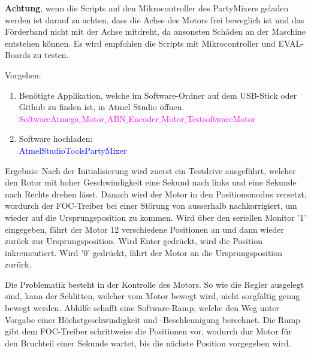 \newpage
\textbf{Achtung}, wenn die Scripts auf den Mikrocontroller des PartyMixers geladen werden ist darauf zu achten, dass die Achse des Motors frei beweglich ist und das Förderband nicht mit der Achse mitdreht, da ansonsten Schäden an der Maschine entstehen können. Es wird empfohlen die Scripts mit Mikrocontroller und EVAL-Boards zu testen.

Vorgehen:
\begin{enumerate}
\item Benötigte Applikation, welche im Software-Ordner auf dem USB-Stick oder Github \cite{aebi_projekt-6softwareatmega_2020} zu finden ist, in Atmel Studio öffnen.\\
\textcolor{magenta}{Software\textrightarrow Atmega\underline{ }Motor\underline{ }ABN\underline{ }Encoder\underline{ }Motor\underline{ }Testsoftware\textrightarrow Motor}\\

\item Software hochladen:\\
\textcolor{blue}{AtmelStudio\textrightarrow Tools\textrightarrow PartyMixer}\\


\end{enumerate}

Ergebnis: Nach der Initialisierung wird zuerst ein Testdrive ausgeführt, welcher den Rotor mit hoher Geschwindigkeit eine Sekund nach links und eine Sekunde nach Rechts drehen lässt. Danach wird der Motor in den Positionsmodus versetzt, wordurch der FOC-Treiber bei einer Störung von ausserhalb nachkorrigiert, um wieder auf die Ursprungsposition zu kommen. Wird über den seriellen Monitor '1' eingegeben, fährt der Motor 12 verschiedene Positionen an und dann wieder zurück zur Ursprungsposition. Wird Enter gedrückt, wird die Position inkrementiert. Wird '0' gedrückt, fährt der Motor an die Ursprungsposition zurück.

Die Problematik besteht in der Kontrolle des Motors. So wie die Regler ausgelegt sind, kann der Schlitten, welcher vom Motor bewegt wird, nicht sorgfältig genug bewegt werden. Abhilfe schafft eine Software-Ramp, welche den Weg unter Vorgabe einer Höchstgeschwindigkeit und -Beschleunigung berechnet. Die Ramp gibt dem FOC-Treiber schrittweise die Positionen vor, wodurch dur Motor für den Bruchteil einer Sekunde wartet, bis die nächste Position vorgegeben wird.